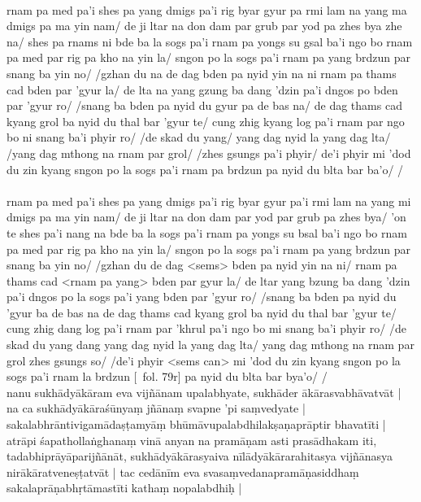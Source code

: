 \documentclass[12pt]{article}
\begin{document}
\textbf{\TVA}\\
rnam pa med pa'i shes pa yang dmigs pa'i rig byar gyur pa rmi lam na yang ma dmigs pa ma yin nam/ de ji ltar na don dam par grub par yod pa zhes bya zhe na/ shes pa rnams ni bde ba la sogs pa'i rnam pa yongs su gsal ba'i ngo bo rnam pa med par rig pa kho na yin la/ sngon po la sogs pa'i rnam pa yang brdzun par snang ba yin no/ /gzhan du na de dag bden pa nyid yin na ni rnam pa thams cad bden par 'gyur la/ de lta na yang gzung ba dang 'dzin pa'i dngos po bden par 'gyur ro/ /snang ba bden pa nyid du gyur pa de bas na/ de dag thams cad kyang grol ba nyid du thal bar 'gyur te/ cung zhig kyang log pa'i rnam par ngo bo ni snang ba'i phyir ro/ /de skad du yang/ yang dag nyid la yang dag lta/ /yang dag mthong na rnam par grol/ /zhes gsungs pa'i phyir/ de'i phyir mi 'dod du zin kyang sngon po la sogs pa'i rnam pa brdzun pa nyid du blta bar ba'o/ /\\

\textbf{\TVB}\\
rnam pa med pa'i shes pa yang dmigs pa'i rig byar gyur pa'i rmi lam na yang mi dmigs pa ma yin nam/ de ji ltar na don dam par yod par grub pa zhes bya/ 'on te shes pa'i nang na bde ba la sogs pa'i rnam pa yongs su bsal ba'i ngo bo rnam pa med par rig pa kho na yin la/ sngon po la sogs pa'i rnam pa yang brdzun par snang ba yin no/ /gzhan du de dag <sems> bden pa nyid yin na ni/ rnam pa thams cad <rnam pa yang> bden par gyur la/ de ltar yang bzung ba dang 'dzin pa'i dngos po la sogs pa'i yang bden par 'gyur ro/ /snang ba bden pa nyid du 'gyur ba de bas na de dag thams cad kyang grol ba nyid du thal bar 'gyur te/ cung zhig dang log pa'i rnam par 'khrul pa'i ngo bo mi snang ba'i phyir ro/ /de skad du yang dang yang dag nyid la yang dag lta/ yang dag mthong na rnam par grol zhes gsungs so/ /de'i phyir <sems can> mi 'dod du zin kyang sngon po la sogs pa'i rnam la brdzun [\TVB\ fol. 79r] pa nyid du blta bar bya'o/ /\\

nanu sukhādyākāram eva vijñānam upalabhyate, sukhāder ākārasvabhāvatvāt | na ca sukhādyākāraśūnyaṃ jñānaṃ svapne 'pi saṃvedyate | sakalabhrāntivigamādaṣṭamyāṃ bhūmāvupalabdhilakṣaṇaprāptir bhavatīti | atrāpi śapathollaṅghanaṃ vinā anyan na pramāṇam asti prasādhakam iti, tadabhiprāyāparijñānāt, sukhādyākārasyaiva nīlādyākārarahitasya vijñānasya nirākāratveneṣṭatvāt | tac cedānīm eva svasaṃvedanapramāṇasiddhaṃ sakalaprāṇabhṛtāmastīti kathaṃ nopalabdhiḥ |\\
\end{document}
